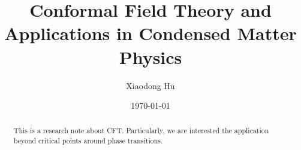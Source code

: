\documentclass[10pt,nofootinbib]{revtex4}
\begin{document}
\title{Conformal Field Theory and Applications in Condensed Matter Physics}%

\author{Xiaodong Hu}

\date{\today}

\begin{abstract}
	This is a research note about CFT. Particularly, we are interested the application beyond critical points around phase transitions.
\end{abstract}
\maketitle
\tableofcontents
\end{document}
